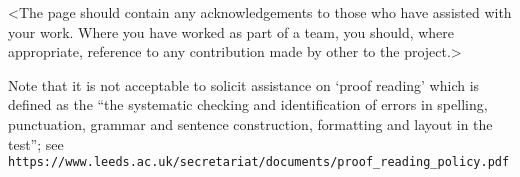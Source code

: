 <The page should contain any acknowledgements to those who have assisted with your work.
Where you have worked as part of a team, you should, where appropriate, reference to any contribution made by other to the project.>

\vspace{1cm}

Note that it is not acceptable to solicit assistance on `proof reading' which is defined as the
``the systematic checking and identification of errors in spelling, punctuation, grammar and sentence construction, formatting and layout in the test'';
see \texttt{https://www.leeds.ac.uk/secretariat/documents/proof\_reading\_policy.pdf}

